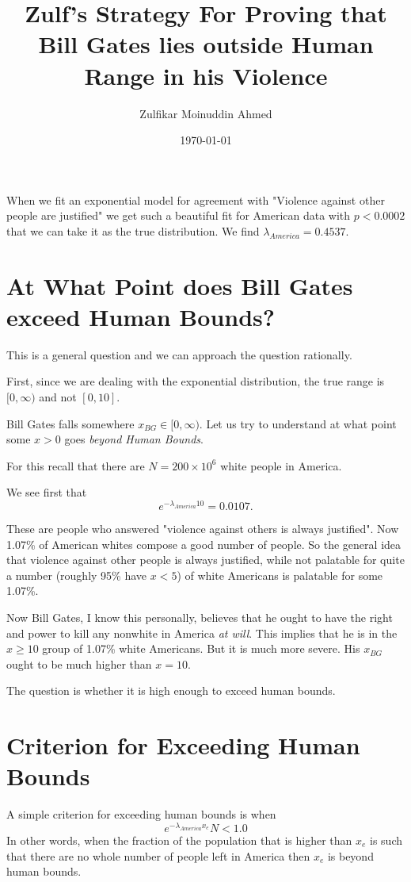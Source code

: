 \documentclass{amsart}
\title{Zulf's Strategy For Proving that Bill Gates lies outside Human Range in his Violence}
\author{Zulfikar Moinuddin Ahmed}
\date{\today}
\begin{document}
\maketitle

When we fit an exponential model for agreement with "Violence against other people are justified" we get such a beautiful fit for American data with $p<0.0002$ that we can take it as the true distribution.  We find $\lambda_{America} = 0.4537$.


\section{At What Point does Bill Gates exceed Human Bounds?}

This is a general question and we can approach the question rationally.

First, since we are dealing with the exponential distribution, the true range is $[0,\infty)$ and not $[0,10]$.  

Bill Gates falls somewhere $x_{BG} \in [0,\infty)$.  Let us try to understand at what point some $x>0$ goes {\em beyond Human Bounds}. 

For this recall that there are $N=200 \times 10^6$ white people in America.  

We see first that 
\[
e^{-\lambda_{America} 10} = 0.0107.
\]

These are people who answered "violence against others is always justified".  Now 1.07\% of American whites compose a good number of people.  So the general idea that violence against other people is always justified, while not palatable for quite a number (roughly 95\% have $x<5$) of white Americans is palatable for some 1.07\%.

Now Bill Gates, I know this personally, believes that he ought to have the right and power to kill any nonwhite in America {\em at will}.  This implies that he is in the $x\ge 10$ group of 1.07\% white Americans.  But it is much more severe.  His $x_{BG}$ ought to be much higher than $x=10$. 

The question is whether it is high enough to exceed human bounds.

\section{Criterion for Exceeding Human Bounds}

A simple criterion for exceeding human bounds is when
\[
e^{-\lambda_{America} x_e} N < 1.0
\]
In other words, when the fraction of the population that is higher than $x_e$ is such that there are no whole number of people left in America then $x_e$ is beyond human bounds.
\end{document}

